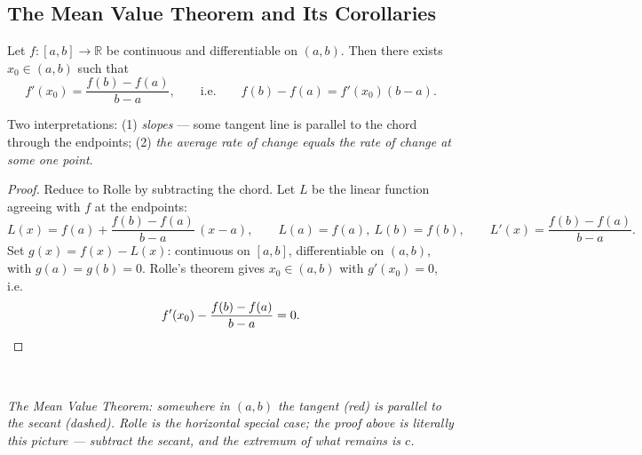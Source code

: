 \documentclass[11pt]{report}
\newcommand{\figcap}[1]{\\[1.5mm]\parbox{0.92\textwidth}{\small\itshape #1}}
\begin{document}
\subsection{The Mean Value Theorem and Its Corollaries}

\begin{thmbox}
Let $f: [a,b] \to \mathbb{R}$ be continuous and differentiable on $(a,b)$. Then there exists $x_0 \in (a,b)$ such that
\[
f'(x_0) = \frac{f(b) - f(a)}{b - a}, \qquad \text{i.e.} \qquad f(b) - f(a) = f'(x_0)(b-a).
\]
\end{thmbox}

Two interpretations: (1) \emph{slopes} --- some tangent line is parallel to the chord through the endpoints; (2) \emph{the average rate of change equals the rate of change at some one point}.

\begin{proof}
Reduce to Rolle by subtracting the chord. Let $L$ be the linear function agreeing with $f$ at the endpoints:
\[
L(x) = f(a) + \frac{f(b) - f(a)}{b-a}\,(x - a), \qquad L(a) = f(a),\ L(b) = f(b), \qquad L'(x) = \frac{f(b)-f(a)}{b-a}.
\]
Set $g(x) = f(x) - L(x)$: continuous on $[a,b]$, differentiable on $(a,b)$, with $g(a) = g(b) = 0$. Rolle's theorem gives $x_0 \in (a,b)$ with $g'(x_0) = 0$, i.e.
\[
f'(x_0) - \frac{f(b)-f(a)}{b-a} = 0. \qedhere
\]
\end{proof}

\begin{center}
\figcap{The Mean Value Theorem: somewhere in $(a,b)$ the tangent (red) is parallel to the secant (dashed). Rolle is the horizontal special case; the proof above is literally this picture --- subtract the secant, and the extremum of what remains is $c$.}
\end{center}
\end{document}
